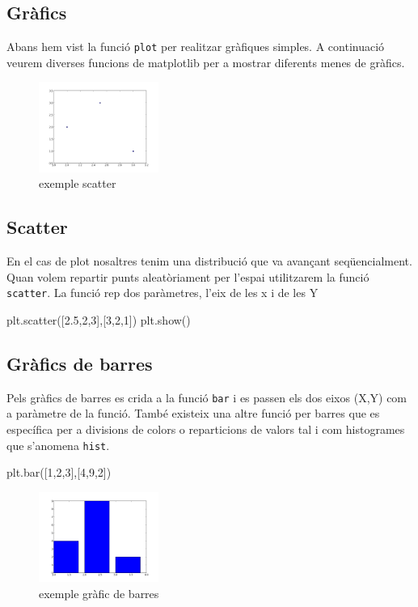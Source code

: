 \subsection{Gràfics}
Abans hem vist la funció {\tt plot} per realitzar gràfiques simples. A continuació veurem diverses funcions de matplotlib per a mostrar diferents menes de gràfics.
\begin{figure}[!h]
    \begin{centering}
    \includegraphics[width=0.35\textwidth]{img/ex03.png}
    \caption{exemple scatter}
    \label{fig:figex03}
    \end{centering}
\end{figure}
\subsection{Scatter}
En el cas de plot nosaltres tenim una distribució que va avançant seqüencialment. Quan volem repartir punts aleatòriament per l'espai utilitzarem la funció {\tt scatter}. La funció rep dos paràmetres, l'eix de les x i de les Y
\begin{tip}[caption=Funcio scatter]
plt.scatter([2.5,2,3],[3,2,1])
plt.show()
\end{tip}
\subsection{Gràfics de barres}
Pels gràfics de barres es crida a la funció {\tt bar} i es passen els dos eixos (X,Y) com a paràmetre de la funció. També existeix una altre funció per barres que es específica per a divisions de colors o reparticions de valors tal i com histogrames que s'anomena {\tt hist}.
\begin{tip}[caption=Gràfic de barres]
plt.bar([1,2,3],[4,9,2])
\end{tip}
\begin{figure}[!h]
    \begin{centering}
    \includegraphics[width=0.35\textwidth]{img/ex04.png}
    \caption{exemple gràfic de barres}
    \label{fig:figex04}
    \end{centering}
\end{figure}
